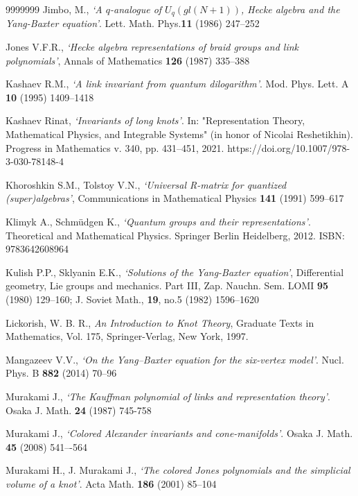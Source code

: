 \documentclass[11pt]{article}
\begin{document}
\begin{thebibliography}{9999999}
Jimbo, M., {\em `A $q$-analogue of $U_q (gl(N +1))$, Hecke algebra and the Yang-Baxter equation'}. Lett.
Math. Phys.{\bf 11}  (1986) 247–252	
	
Jones V.F.R., {\em `Hecke algebra representations of braid groups and link polynomials'},
Annals of Mathematics {\bf 126} (1987) 335--388
	
  Kashaev R.M., {\em `A link invariant from quantum dilogarithm'}. Mod. Phys. Lett. A {\bf 10} (1995) 1409--1418

  Kashaev Rinat, {\em `Invariants of long knots'}. In: "Representation Theory, Mathematical Physics, and Integrable Systems" (in honor of Nicolai Reshetikhin).  Progress in Mathematics
v. 340, pp. 431--451, 2021. https://doi.org/10.1007/978-3-030-78148-4

Khoroshkin S.M., Tolstoy V.N., {\em `Universal R-matrix for quantized (super)algebras'},
Communications in Mathematical Physics {\bf 141} (1991) 599--617

 Klimyk A., Schm\"udgen K., {\em `Quantum groups and their representations'}.
 Theoretical and Mathematical Physics. Springer Berlin Heidelberg, 2012. ISBN: 9783642608964

  Kulish P.P.,  Sklyanin E.K., {\em `Solutions of the Yang-Baxter equation'}, Differential geometry, Lie groups and mechanics. Part III, Zap. Nauchn. Sem. LOMI {\bf 95} (1980) 129–160; J. Soviet Math., {\bf 19}, no.5 (1982) 1596–1620


Lickorish, W. B. R.,
{\em An Introduction to Knot Theory},
Graduate Texts in Mathematics, Vol. 175,
Springer-Verlag, New York, 1997.

 Mangazeev V.V., {\em `On the Yang–Baxter equation for the six-vertex model'}.
Nucl. Phys. B {\bf  882} (2014) 70--96

 Murakami J., {\em `The Kauffman polynomial of links and 
representation theory'}.
Osaka J. Math. {\bf 24} (1987) 745-758

 Murakami J.,
{\em `Colored Alexander invariants and cone-manifolds'}.
Osaka J. Math. {\bf 45} (2008) 541–-564

  Murakami H.,   J. Murakami J., {\em `The colored Jones polynomials and the simplicial volume of a knot'}. Acta Math. {\bf 186} (2001) 85--104
	


\end{thebibliography}
\end{document}
